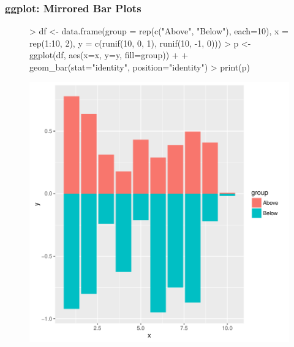 \documentclass{beamer}
\begin{document}
\begin{frame}[containsverbatim]  
	\frametitle{ggplot: Mirrored Bar Plots}
\tiny
\begin{figure}
  \centering
\begin{Schunk}
\begin{Sinput}
> df <- data.frame(group = rep(c("Above", "Below"), each=10), x = rep(1:10, 2), y = c(runif(10, 0, 1), runif(10, -1, 0)))
> p <- ggplot(df, aes(x=x, y=y, fill=group)) + 
+ 	    geom_bar(stat="identity", position="identity")
> print(p) 
\end{Sinput}
\end{Schunk}
\includegraphics{fig--063}
\label{fig:qplotscatter}
\end{figure}
\end{frame}
\end{document}
